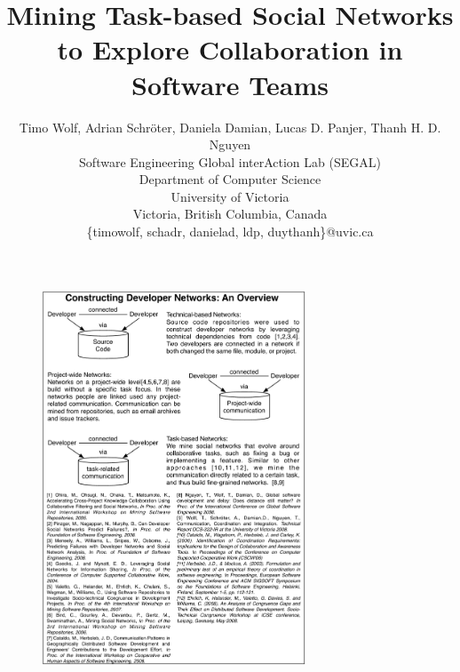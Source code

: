 \documentclass[times, 10pt,twocolumn]{article}
\begin{document}
\title{Mining Task-based Social Networks to Explore Collaboration in Software
Teams} \author{
Timo Wolf, Adrian Schr\"oter, Daniela Damian, Lucas D. Panjer, Thanh H. D.
Nguyen\\ Software Engineering Global interAction Lab (SEGAL)\\
Department of Computer Science\\
University of Victoria\\
Victoria, British Columbia, Canada\\
\{timowolf, schadr, danielad, ldp, duythanh\}@uvic.ca\\
}

\maketitle
\thispagestyle{empty}






\begin{figure}[t!]
\begin{center}
\includegraphics[width=0.7\textwidth]{./figures/related_work.pdf}
\end{center}
\end{figure}











\end{document}
